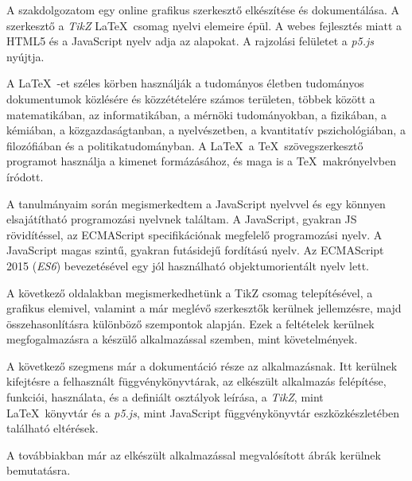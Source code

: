 
A szakdolgozatom egy online grafikus szerkesztő elkészítése és dokumentálása. A szerkesztő a \textit{TikZ} \LaTeX\ csomag nyelvi elemeire épül. A webes fejlesztés miatt a HTML5 és a JavaScript nyelv adja az alapokat. A rajzolási felületet a \textit{p5.js} nyújtja.

A \LaTeX\ -et széles körben használják a tudományos életben tudományos dokumentumok közlésére és közzétételére számos területen, többek között a matematikában, az informatikában, a mérnöki tudományokban, a fizikában, a kémiában, a közgazdaságtanban, a nyelvészetben, a kvantitatív pszichológiában, a filozófiában és a politikatudományban. A \LaTeX\ a \TeX\ szövegszerkesztő programot használja a kimenet formázásához, és maga is a \TeX\ makrónyelvben íródott.

A tanulmányaim során megismerkedtem a JavaScript nyelvvel és egy könnyen elsajátítható programozási nyelvnek találtam. A JavaScript, gyakran JS rövidítéssel, az ECMAScript specifikációnak megfelelő programozási nyelv. A JavaScript magas szintű, gyakran futásidejű fordítású nyelv. Az ECMAScript 2015 (\textit{ES6}) bevezetésével egy jól használható  objektumorientált nyelv lett.

A következő oldalakban megismerkedhetünk a TikZ csomag telepítésével, a grafikus elemivel, valamint a már meglévő szerkesztők kerülnek jellemzésre, majd összehasonlításra különböző szempontok alapján. Ezek a feltételek kerülnek megfogalmazásra a készülő alkalmazással szemben, mint követelmények.

 A következő szegmens már a dokumentáció része az alkalmazásnak. Itt kerülnek kifejtésre a felhasznált függvénykönyvtárak, az elkészült alkalmazás felépítése, funkciói, használata, és a definiált osztályok leírása, a \textit{TikZ}, mint \LaTeX\ könyvtár és a \textit{p5.js}, mint JavaScript függvénykönyvtár eszközkészletében található eltérések. 
 
 A továbbiakban már az elkészült alkalmazással megvalósított ábrák kerülnek bemutatásra.

